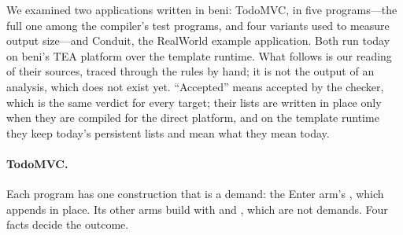 We examined two applications written in beni: TodoMVC, in five programs---the full one among the
compiler's test programs, and four variants used to measure output size---and Conduit, the RealWorld
example application. Both run today on beni's TEA platform over the template runtime. What follows is our
reading of their sources, traced through the rules by hand; it is not the output of an analysis, which
does not exist yet. ``Accepted'' means accepted by the checker, which is the same verdict for every
target; their lists are written in place only when they are compiled for the direct platform, and on the
template runtime they keep today's persistent lists and mean what they mean today.

\paragraph{TodoMVC.} Each program has one construction that is a demand: the Enter arm's
, which appends in place. Its other arms
build with  and , which are not demands. Four facts decide the outcome.
